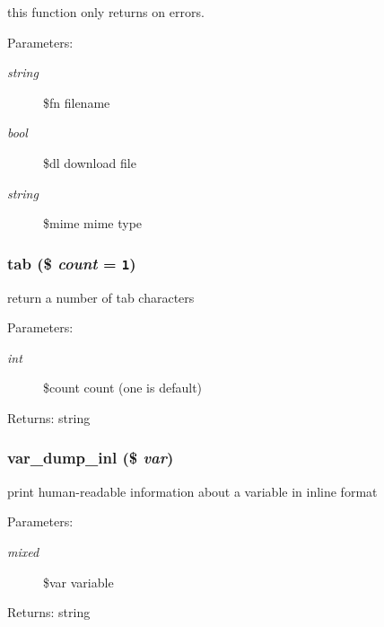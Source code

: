 this function only returns on errors. \begin{Desc}
\item[Parameters:]
\begin{description}
\item[{\em string}]\$fn filename \item[{\em bool}]\$dl download file \item[{\em string}]\$mime mime type \end{description}
\end{Desc}
\hypertarget{util_8inc_8php_74e38925e7162356a2ea14db32664c37}{
\subsubsection[{tab}]{\setlength{\rightskip}{0pt plus 5cm}tab (\$ {\em count} = {\tt 1})}}
\label{util_8inc_8php_74e38925e7162356a2ea14db32664c37}


return a number of tab characters

\begin{Desc}
\item[Parameters:]
\begin{description}
\item[{\em int}]\$count count (one is default) \end{description}
\end{Desc}
\begin{Desc}
\item[Returns:]string \end{Desc}
\hypertarget{util_8inc_8php_a5cc9d5f8a0b5bb76dfe3d15796e5940}{
\subsubsection[{var\_\-dump\_\-inl}]{\setlength{\rightskip}{0pt plus 5cm}var\_\-dump\_\-inl (\$ {\em var})}}
\label{util_8inc_8php_a5cc9d5f8a0b5bb76dfe3d15796e5940}


print human-readable information about a variable in inline format

\begin{Desc}
\item[Parameters:]
\begin{description}
\item[{\em mixed}]\$var variable \end{description}
\end{Desc}
\begin{Desc}
\item[Returns:]string \end{Desc}
